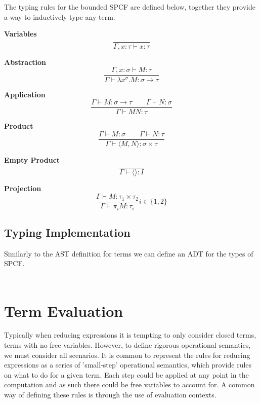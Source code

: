 \documentclass[12pt,a4paper]{report}
\theoremstyle{definition}
\theoremstyle{remark}
\begin{document}
The typing rules for the bounded SPCF are defined below, together they provide a way to inductively type any term. 

\textbf{Variables}
\begin{equation}
    \frac{}{\Gamma, x:\tau \vdash x: \tau}
\end{equation}

\textbf{Abstraction}
\begin{equation}
    \frac{\Gamma, x:\sigma \vdash M : \tau}{\Gamma \vdash \lambda x^{\sigma}. M : \sigma \rightarrow \tau}
\end{equation}

\textbf{Application}
\begin{equation}
    \frac{\Gamma \vdash M : \sigma \rightarrow \tau \quad\quad \Gamma \vdash N : \sigma}{\Gamma \vdash MN : \tau}
\end{equation}

\textbf{Product}
\begin{equation}
    \frac{\Gamma \vdash M:\sigma \quad\quad \Gamma \vdash N:\tau}{\Gamma \vdash \langle M,N \rangle : \sigma \times \tau}
\end{equation}

\textbf{Empty Product}
\begin{equation}
    \frac{}{\Gamma \vdash \langle \rangle : I}
\end{equation}

\textbf{Projection}
\begin{equation}
    \frac{\Gamma \vdash M:\tau_1 \times \tau_2}{\Gamma \vdash \pi_i M: \tau_i} i \in \{1, 2\}
\end{equation}

\subsection{Typing Implementation}


Similarly to the AST definition for terms we can define an ADT for the types of SPCF.

$\frac{}{}$

\section{Term Evaluation}\label{section: evaluation}
Typically when reducing expressions it is tempting to only consider closed terms, terms with no free variables. However, to define rigorous operational semantics, we must consider all scenarios. It is common to represent the rules for reducing expressions as a series of 'small-step' operational semantics, which provide rules on what to do for a given term. Each step could be applied at any point in the computation and as such there could be free variables to account for. A common way of defining these rules is through the use of evaluation contexts.
\end{document}
